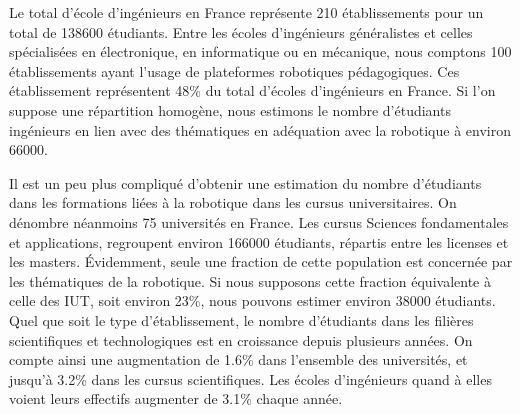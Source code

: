\documentclass[a4paper,12pt]{report}
\begin{document}
Le total d'école d'ingénieurs en France représente 210 établissements pour un total de 138600 étudiants.
Entre les écoles d'ingénieurs généralistes et celles spécialisées en électronique, en informatique ou en mécanique, nous comptons 100 établissements ayant l'usage de plateformes robotiques pédagogiques.
Ces établissement représentent 48\% du total d'écoles d'ingénieurs en France. Si l'on suppose une répartition homogène, nous estimons le nombre d'étudiants ingénieurs en lien avec des thématiques en adéquation avec la robotique à environ 66000.

Il est un peu plus compliqué d'obtenir une estimation du nombre d'étudiants dans les formations liées à la robotique dans les cursus universitaires.
On dénombre néanmoins 75 universités en France.
Les cursus \og{}Sciences fondamentales et applications\fg{}, regroupent environ 166000 étudiants, répartis entre les licenses et les masters.
Évidemment, seule une fraction de cette population est concernée par les thématiques de la robotique.
Si nous supposons cette fraction équivalente à celle des IUT, soit environ 23\%, nous pouvons estimer environ 38000 étudiants.\\

Quel que soit le type d'établissement, le nombre d'étudiants dans les filières scientifiques et technologiques est en croissance depuis plusieurs années.
On compte ainsi une augmentation de 1.6\% dans l'ensemble des universités, et jusqu'à 3.2\% dans les cursus scientifiques.
Les écoles d'ingénieurs quand à elles voient leurs effectifs augmenter de 3.1\% chaque année.

\end{document}
